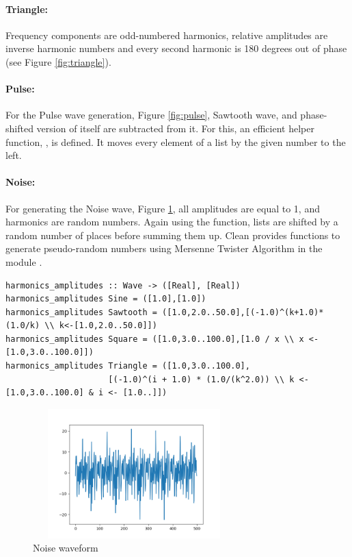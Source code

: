 \documentclass[runningheads]{llncs}
\begin{document}
\paragraph{\textbf{Triangle:}} Frequency components are odd-numbered harmonics, relative amplitudes are inverse harmonic numbers and every second harmonic is 180 degrees out of phase (see Figure \ref{fig:triangle}).

\paragraph{\textbf{Pulse:}} For the Pulse wave generation, Figure \ref{fig:pulse}, Sawtooth wave, and phase-shifted version of itself are subtracted from it. For this, an efficient helper function, , is defined. It moves every element of a list by the given number to the left.  

\paragraph{\textbf{Noise:}} For generating the Noise wave, Figure \ref{fig:noise}, all amplitudes are equal to 1, and harmonics are random numbers. Again using the  function, lists are shifted by a random number of places before summing them up. Clean provides functions to generate pseudo-random numbers using Mersenne Twister Algorithm \cite{randoms} in the module .

\begin{lstlisting}[language=Clean,label={cod:harmonics_amplitudes},caption={Function that returns respective lists of harmonics and amplitudes for different waves}, captionpos=b]
harmonics_amplitudes :: Wave -> ([Real], [Real])
harmonics_amplitudes Sine = ([1.0],[1.0])
harmonics_amplitudes Sawtooth = ([1.0,2.0..50.0],[(-1.0)^(k+1.0)*(1.0/k) \\ k<-[1.0,2.0..50.0]])
harmonics_amplitudes Square = ([1.0,3.0..100.0],[1.0 / x \\ x <- [1.0,3.0..100.0]])
harmonics_amplitudes Triangle = ([1.0,3.0..100.0],
                     [(-1.0)^(i + 1.0) * (1.0/(k^2.0)) \\ k <- [1.0,3.0..100.0] & i <- [1.0..]])
\end{lstlisting}

\begin{figure}[!htb]
        \centering
        \includegraphics[width=0.7\textwidth,height=5cm]{noise.png} 
        \caption{Noise waveform}
        \label{fig:noise}
\end{figure}
\end{document}
